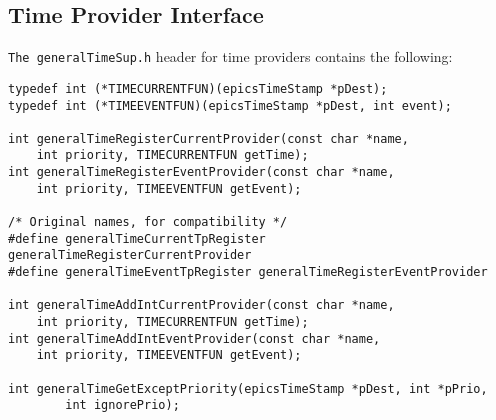 \subsection{Time Provider Interface}

\verb|The generalTimeSup.h| header for time providers contains the following:

\begin{verbatim}typedef int (*TIMECURRENTFUN)(epicsTimeStamp *pDest);
typedef int (*TIMEEVENTFUN)(epicsTimeStamp *pDest, int event);

int generalTimeRegisterCurrentProvider(const char *name,
    int priority, TIMECURRENTFUN getTime);
int generalTimeRegisterEventProvider(const char *name,
    int priority, TIMEEVENTFUN getEvent);

/* Original names, for compatibility */
#define generalTimeCurrentTpRegister generalTimeRegisterCurrentProvider
#define generalTimeEventTpRegister generalTimeRegisterEventProvider

int generalTimeAddIntCurrentProvider(const char *name,
    int priority, TIMECURRENTFUN getTime);
int generalTimeAddIntEventProvider(const char *name,
    int priority, TIMEEVENTFUN getEvent);

int generalTimeGetExceptPriority(epicsTimeStamp *pDest, int *pPrio,
        int ignorePrio);
\end{verbatim}
